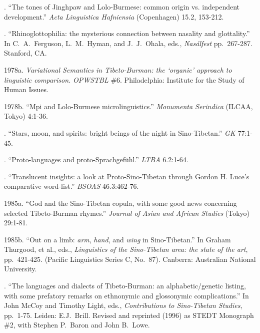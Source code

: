 .
“The tones of Jinghpaw and Lolo-Burmese: common origin vs. independent development.”
\textit{Acta Linguistica Hafniensia} (Copenhagen) 15.2, 153-212.

.
“Rhinoglottophilia: the mysterious connection between nasality and glottality.”
In C.\ A.\ Ferguson, L.\ M.\ Hyman, and J.\ J.\ Ohala, eds., \textit{Nasálfest} pp.\ 267-287.  Stanford, CA.

\rrefline %
1978a.
\textit{Variational Semantics in Tibeto-Burman: the ‘organic’ approach to linguistic comparison.}
\textit{OPWSTBL} \#6.  Philadelphia: Institute for the Study of Human Issues.

\rrefline %
1978b.
“Mpi and Lolo-Burmese microlinguistics.”
\textit{Monumenta Serindica} (ILCAA, Tokyo) 4:1-36.

.
“Stars, moon, and spirits: bright beings of the night in Sino-Tibetan.”
\textit{GK} 77:1-45.

.
“Proto-languages and proto-Sprachgefühl.”
\textit{LTBA} 6.2:1-64.

.
“Translucent insights:  a look at Proto-Sino-Tibetan through Gordon H. Luce’s comparative word-list.”
\textit{BSOAS} 46.3:462-76.

\rrefline %
1985a.
“God and the Sino-Tibetan copula, with some good news concerning selected Tibeto-Burman rhymes.”
\textit{Journal of Asian and African Studies} (Tokyo) 29:1-81.

\rrefline %
1985b.
“Out on a limb: \textit{arm}, \textit{hand}, and \textit{wing} in Sino-Tibetan.”
In Graham Thurgood, et al., eds., \textit{Linguistics of the Sino-Tibetan area: the state of the art}, pp.\ 421-425.  (Pacific Linguistics Series C, No.~87).  Canberra: Australian National University.

.
“The languages and dialects of Tibeto-Burman: an alphabetic/genetic listing, with some prefatory remarks on ethnonymic and glossonymic complications.”
In John McCoy and Timothy Light, eds., \textit{Contributions to Sino-Tibetan Studies}, pp.\ 1-75.  Leiden: E.J.\ Brill. Revised and reprinted (1996) as STEDT Monograph \#2, with Stephen P.\ Baron and John B.\ Lowe.

